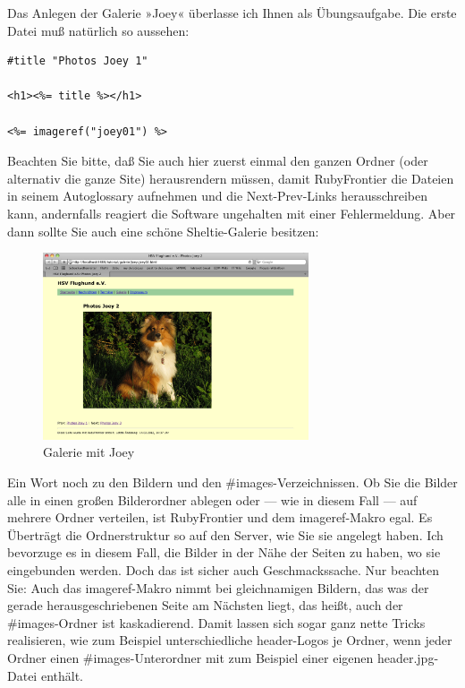 \documentclass[11pt]{report}
\begin{document}
Das Anlegen der Galerie »Joey« überlasse ich Ihnen als
Übungsaufgabe. Die erste Datei muß natürlich so aussehen:


\begin{verbatim}
#title "Photos Joey 1"

<h1><%= title %></h1>

<%= imageref("joey01") %>
\end{verbatim}

Beachten Sie bitte, daß Sie auch hier zuerst einmal den ganzen Ordner
(oder alternativ die ganze Site) herausrendern müssen, damit
RubyFrontier die Dateien in seinem Autoglossary aufnehmen und die
Next-Prev-Links herausschreiben kann, andernfalls reagiert die
Software ungehalten mit einer Fehlermeldung. Aber dann sollte Sie auch
eine schöne Sheltie-Galerie besitzen:

\begin{figure}[h!]
\centering
\includegraphics[width=0.7\textwidth]{./images/galerie06.png}
\caption{\label{galerie06}Galerie mit Joey}
\end{figure}

Ein Wort noch zu den Bildern und den \#images-Verzeichnissen. Ob Sie
die Bilder alle in einen großen Bilderordner ablegen oder — wie in
diesem Fall — auf mehrere Ordner verteilen, ist RubyFrontier und dem
imageref-Makro egal. Es Überträgt die Ordnerstruktur so auf den
Server, wie Sie sie angelegt haben. Ich bevorzuge es in diesem Fall,
die Bilder in der Nähe der Seiten zu haben, wo sie eingebunden
werden. Doch das ist sicher auch Geschmackssache. Nur beachten Sie:
Auch das imageref-Makro nimmt bei gleichnamigen Bildern, das was der
gerade herausgeschriebenen Seite am Nächsten liegt, das heißt, auch
der \#images-Ordner ist kaskadierend. Damit lassen sich sogar ganz
nette Tricks realisieren, wie zum Beispiel unterschiedliche
header-Logos je Ordner, wenn jeder Ordner einen \#images-Unterordner
mit zum Beispiel einer eigenen header.jpg-Datei enthält.
\end{document}
